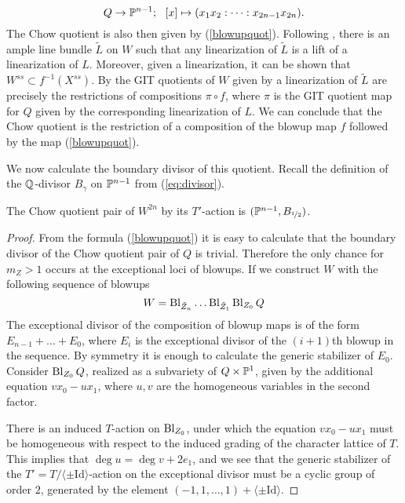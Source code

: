 \begin{equation} \label{blowupquot}
Q \to \mathbb{P}^{n-1}; \ \ [x] \mapsto (x_1x_2:\dots :x_{2n-1}x_{2n}).
\end{equation}
The Chow quotient is also then given by (\ref{blowupquot}). Following \cite{kirwan}, there is an ample line bundle \(\tilde{L}\) on \(W\) such that any linearization of \(\tilde{L}\) is a lift of a linearization of \(L\). Moreover, given a linearization, it can  be shown that \(W^{ss} \subset f^{-1}(X^{ss})\). By \cite[Lemma 3.11]{kirwan} the GIT quotients of \(W\) given by a linearization of \(\tilde{L}\) are precisely the restrictions of compositions \(\pi \circ f\), where \(\pi\) is the GIT quotient map for \(Q\) given by the corresponding linearization of \(L\). We can conclude that the Chow quotient is the restriction of a composition of the blowup map \(f\) followed by the map (\ref{blowupquot}).

We now calculate the boundary divisor of this quotient. Recall the definition of the \(\mathbb{Q}\)-divisor \(B_\gamma\) on \(\mathbb{P}^{n-1}\) from (\ref{eq:divisor}).
\begin{lemma}\label{lem:1.6}
The Chow quotient pair of \(W^{2n}\) by its \(T'\)-action is \((\mathbb{P}^{n-1},B_{\nicefrac{1}{2}})\).
\end{lemma}
\begin{proof}
From the formula (\ref{blowupquot}) it is easy to calculate that the boundary divisor of the Chow quotient pair of \(Q\) is trivial. Therefore the only chance for \(m_Z >1\) occurs at the exceptional loci of blowups. If we construct \(W\) with the following sequence of blowups
\[
W = \operatorname{Bl}_{\tilde{Z}_{n}} \dots \operatorname{Bl}_{\tilde{Z}_1} \operatorname{Bl}_{Z_0} Q
\]
The exceptional divisor of the composition of blowup maps is of the form \(E_{n-1} + \dots + E_0\), where \(E_i\) is the exceptional divisor of the \((i+1)\)th blowup in the sequence. By symmetry it is enough to calculate the generic stabilizer of \(E_0\). Consider \(\operatorname{Bl}_{Z_0}Q\), realized as a subvariety of \(Q \times \mathbb{P}^1 \), given by the additional equation \(vx_0 - ux_1\), where \(u,v\) are the homogeneous variables in the second factor.

There is an induced \(T\)-action on \(\operatorname{Bl}_{Z_0}\), under which the equation \(vx_0 - ux_1\) must be homogeneous with respect to the induced grading of the character lattice of \(T\). This implies that \(\deg u = \deg v + 2e_1\), and we see that the generic stabilizer of the \(T' = T/ \langle \pm \text{Id} \rangle \)-action on the exceptional divisor must be a cyclic group of order \(2\), generated by the element \((-1,1,\dots,1) + \langle \pm \text{Id} \rangle\). 
\end{proof}
